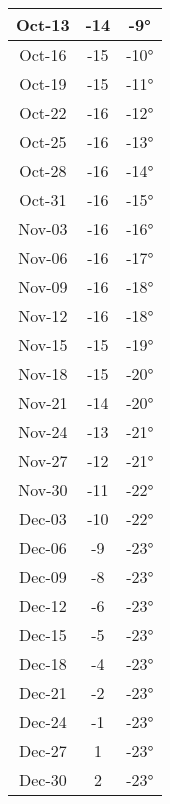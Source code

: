\begin{footnotesize}
\begin{minipage}{0.33\textwidth}
\begin{tabular}[t]{c | c | c}
Oct-13 & -14 & -9°\\\hline
Oct-16 & -15 & -10°\\\hline
Oct-19 & -15 & -11°\\\hline
Oct-22 & -16 & -12°\\\hline
Oct-25 & -16 & -13°\\\hline
Oct-28 & -16 & -14°\\\hline
Oct-31 & -16 & -15°\\\hline
Nov-03 & -16 & -16°\\\hline
Nov-06 & -16 & -17°\\\hline
Nov-09 & -16 & -18°\\\hline
Nov-12 & -16 & -18°\\\hline
Nov-15 & -15 & -19°\\\hline
Nov-18 & -15 & -20°\\\hline
Nov-21 & -14 & -20°\\\hline
Nov-24 & -13 & -21°\\\hline
Nov-27 & -12 & -21°\\\hline
Nov-30 & -11 & -22°\\\hline
Dec-03 & -10 & -22°\\\hline
Dec-06 & -9 & -23°\\\hline
Dec-09 & -8 & -23°\\\hline
Dec-12 & -6 & -23°\\\hline
Dec-15 & -5 & -23°\\\hline
Dec-18 & -4 & -23°\\\hline
Dec-21 & -2 & -23°\\\hline
Dec-24 & -1 & -23°\\\hline
Dec-27 & 1 & -23°\\\hline
Dec-30 & 2 & -23°\\\hline
\end{tabular}\end{minipage}
\end{footnotesize}

